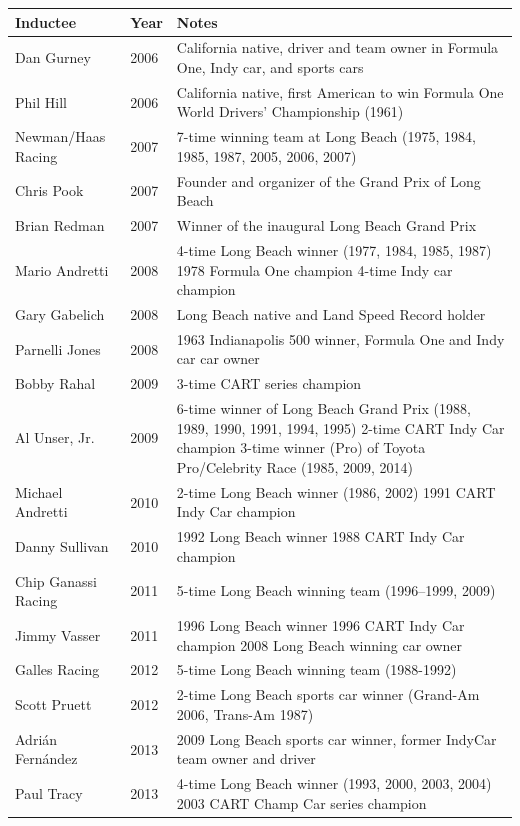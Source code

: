 \documentclass{article}
\begin{document}
\begin{tabular}{lll}
\toprule
Inductee & Year & Notes \\
\midrule
Dan Gurney & 2006 & California native, driver and team owner in Formula One, Indy car, and sports cars \\
Phil Hill & 2006 & California native, first American to win Formula One World Drivers' Championship (1961) \\
Newman/Haas Racing & 2007 & 7-time winning team at Long Beach (1975, 1984, 1985, 1987, 2005, 2006, 2007) \\
Chris Pook & 2007 & Founder and organizer of the Grand Prix of Long Beach \\
Brian Redman & 2007 & Winner of the inaugural Long Beach Grand Prix \\
Mario Andretti & 2008 & 4-time Long Beach winner (1977, 1984, 1985, 1987) 1978 Formula One champion 4-time Indy car champion \\
Gary Gabelich & 2008 & Long Beach native and Land Speed Record holder \\
Parnelli Jones & 2008 & 1963 Indianapolis 500 winner, Formula One and Indy car car owner \\
Bobby Rahal & 2009 & 3-time CART series champion \\
Al Unser, Jr. & 2009 & 6-time winner of Long Beach Grand Prix (1988, 1989, 1990, 1991, 1994, 1995) 2-time CART Indy Car champion 3-time winner (Pro) of Toyota Pro/Celebrity Race (1985, 2009, 2014) \\
Michael Andretti & 2010 & 2-time Long Beach winner (1986, 2002) 1991 CART Indy Car champion \\
Danny Sullivan & 2010 & 1992 Long Beach winner 1988 CART Indy Car champion \\
Chip Ganassi Racing & 2011 & 5-time Long Beach winning team (1996–1999, 2009) \\
Jimmy Vasser & 2011 & 1996 Long Beach winner 1996 CART Indy Car champion 2008 Long Beach winning car owner \\
Galles Racing & 2012 & 5-time Long Beach winning team (1988-1992) \\
Scott Pruett & 2012 & 2-time Long Beach sports car winner (Grand-Am 2006, Trans-Am 1987) \\
Adrián Fernández & 2013 & 2009 Long Beach sports car winner, former IndyCar team owner and driver \\
Paul Tracy & 2013 & 4-time Long Beach winner (1993, 2000, 2003, 2004) 2003 CART Champ Car series champion \\

\end{tabular}
\end{document}
